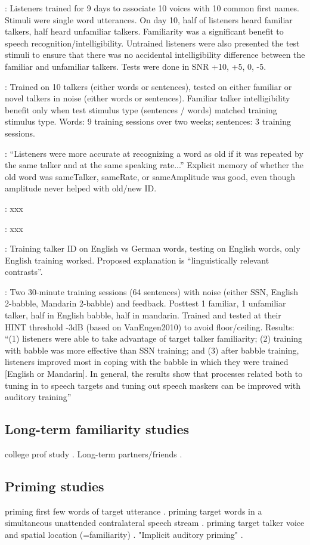 \citep{NygaardEtAl1994}: Listeners trained for 9 days to associate 10 voices with 10 common first names.  Stimuli were single word utterances.  On day 10, half of listeners heard familiar talkers, half heard unfamiliar talkers.  Familiarity was a significant benefit to speech recognition/intelligibility. Untrained listeners were also presented the test stimuli to ensure that there was no accidental intelligibility difference between the familiar and unfamiliar talkers. Tests were done in SNR +10, +5, 0, -5.

\citep{NygaardPisoni1998}: Trained on 10 talkers (either words or sentences), tested on either familiar or novel talkers in noise (either words or sentences).  Familiar talker intelligibility benefit only when test stimulus type (sentences / words) matched training stimulus type.  Words: 9 training sessions over two weeks; sentences: 3 training sessions.

\citep{BradlowEtAl1999}: “Listeners were more accurate at recognizing a word as old if it was repeated by the same talker and at the same speaking rate...”  Explicit memory of whether the old word was sameTalker, sameRate, or sameAmplitude was good, even though amplitude never helped with old/new ID. 

\citep{YonanSommers2000}: xxx

\citep{VanEngen2010}: xxx

\citep{LeviEtAl2011}: Training talker ID on English vs German words, testing on English words, only English training worked.  Proposed explanation is “linguistically relevant contrasts”.

\citep{VanEngen2012}: Two 30-minute training sessions (64 sentences) with noise (either SSN, English 2-babble, Mandarin 2-babble) and feedback.  Posttest 1 familiar, 1 unfamiliar talker, half in English babble, half in mandarin.  Trained and tested at their HINT threshold -3dB (based on VanEngen2010) to avoid floor/ceiling.  Results: “(1) listeners were able to take advantage of target talker familiarity; (2) training with babble was more effective than SSN training; and (3) after babble training, listeners improved most in coping with the babble in which they were trained [English or Mandarin]. In general, the results show that processes related both to tuning in to speech targets and tuning out speech maskers can be improved with auditory training”

\subsection{Long-term familiarity studies}
college prof study \citep{NewmanEvers2007}.  Long-term partners/friends \citep{SouzaEtAl2013}.

\subsection{Priming studies}
priming first few words of target utterance \citep{FreymanEtAl2004}.  priming target words in a simultaneous unattended contralateral speech stream \citep{RivenezEtAl2006}.  priming target talker voice and spatial location (=familiarity) \citep{KiddEtAl2005a, KitterickEtAl2010}.  "Implicit auditory priming" \citep{Sommers1999}.


